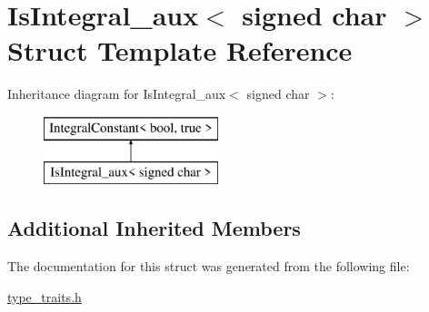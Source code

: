 \hypertarget{struct_is_integral__aux_3_01signed_01char_01_4}{}\section{Is\+Integral\+\_\+aux$<$ signed char $>$ Struct Template Reference}
\label{struct_is_integral__aux_3_01signed_01char_01_4}
Inheritance diagram for Is\+Integral\+\_\+aux$<$ signed char $>$\+:\begin{figure}[H]
\begin{center}
\leavevmode
\includegraphics[height=2.000000cm]{struct_is_integral__aux_3_01signed_01char_01_4}
\end{center}
\end{figure}
\subsection*{Additional Inherited Members}


The documentation for this struct was generated from the following file\+:\begin{DoxyCompactItemize}
\item 
\hyperlink{type__traits_8h}{type\+\_\+traits.\+h}\end{DoxyCompactItemize}
